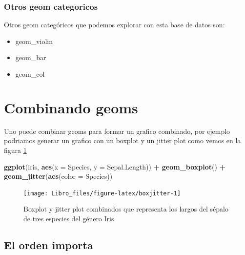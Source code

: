 \documentclass[]{book}
\newenvironment{Shaded}{\begin{snugshade}}{\end{snugshade}}
\newcommand{\DataTypeTok}[1]{\textcolor[rgb]{0.13,0.29,0.53}{#1}}
\newcommand{\KeywordTok}[1]{\textcolor[rgb]{0.13,0.29,0.53}{\textbf{#1}}}
\newcommand{\NormalTok}[1]{#1}
\newcommand{\OperatorTok}[1]{\textcolor[rgb]{0.81,0.36,0.00}{\textbf{#1}}}
\newcommand{\StringTok}[1]{\textcolor[rgb]{0.31,0.60,0.02}{#1}}
\providecommand{\tightlist}{%
  \setlength{\itemsep}{0pt}\setlength{\parskip}{0pt}}
\begin{document}
\hypertarget{otros-geom-categoricos}{%
\subsubsection{Otros geom categoricos}\label{otros-geom-categoricos}}

Otros geom categóricos que podemos explorar con esta base de datos son:

\begin{itemize}
\tightlist
\item
  geom\_violin
\item
  geom\_bar
\item
  geom\_col
\end{itemize}

\hypertarget{combinando-geoms}{%
\section{Combinando geoms}\label{combinando-geoms}}

Uno puede combinar geoms para formar un grafico combinado, por ejemplo
podriamos generar un grafico con un boxplot y un jitter plot como vemos
en la figura \ref{fig:boxjitter}

\begin{Shaded}
\begin{Highlighting}[]
\KeywordTok{ggplot}\NormalTok{(iris, }\KeywordTok{aes}\NormalTok{(}\DataTypeTok{x =}\NormalTok{ Species, }\DataTypeTok{y =}\NormalTok{ Sepal.Length)) }\OperatorTok{+}\StringTok{ }\KeywordTok{geom_boxplot}\NormalTok{() }\OperatorTok{+}\StringTok{ }
\StringTok{    }\KeywordTok{geom_jitter}\NormalTok{(}\KeywordTok{aes}\NormalTok{(}\DataTypeTok{color =}\NormalTok{ Species))}
\end{Highlighting}
\end{Shaded}

\begin{figure}

{\centering \texttt{[image: Libro\_files/figure-latex/boxjitter-1]} 

}

\caption{Boxplot y jitter plot combinados que representa los largos del sépalo de tres especies del género Iris.}\label{fig:boxjitter}
\end{figure}

\hypertarget{el-orden-importa}{%
\subsection{El orden importa}\label{el-orden-importa}}
\end{document}
